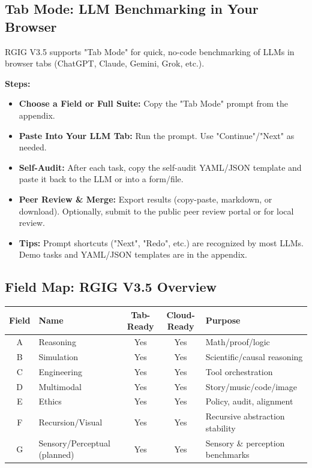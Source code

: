 \documentclass[11pt]{article}
\begin{document}
\subsection*{Tab Mode: LLM Benchmarking in Your Browser}
RGIG V3.5 supports "Tab Mode" for quick, no-code benchmarking of LLMs in browser tabs (ChatGPT, Claude, Gemini, Grok, etc.).

\textbf{Steps:}
\begin{itemize}
  \item \textbf{Choose a Field or Full Suite:} Copy the "Tab Mode" prompt from the appendix.
  \item \textbf{Paste Into Your LLM Tab:} Run the prompt. Use "Continue"/"Next" as needed.
  \item \textbf{Self-Audit:} After each task, copy the self-audit YAML/JSON template and paste it back to the LLM or into a form/file.
  \item \textbf{Peer Review \& Merge:} Export results (copy-paste, markdown, or download). Optionally, submit to the public peer review portal or for local review.
  \item \textbf{Tips:} Prompt shortcuts ("Next", "Redo", etc.) are recognized by most LLMs. Demo tasks and YAML/JSON templates are in the appendix.
\end{itemize}

\subsection*{Field Map: RGIG V3.5 Overview}
\begin{center}
\begin{tabular}{|c|l|c|c|l|}
\hline
Field & Name & Tab-Ready & Cloud-Ready & Purpose \\
\hline
A & Reasoning & Yes & Yes & Math/proof/logic \\
B & Simulation & Yes & Yes & Scientific/causal reasoning \\
C & Engineering & Yes & Yes & Tool orchestration \\
D & Multimodal & Yes & Yes & Story/music/code/image \\
E & Ethics & Yes & Yes & Policy, audit, alignment \\
F & Recursion/Visual & Yes & Yes & Recursive abstraction stability \\
G & Sensory/Perceptual (planned) & Yes & Yes & Sensory \& perception benchmarks \\
\hline
\end{tabular}
\end{center}
\end{document}
